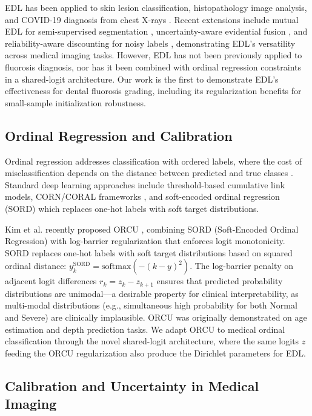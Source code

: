 EDL has been applied to skin lesion classification, histopathology image analysis, and COVID-19 diagnosis from chest X-rays \cite{ulmer2022prior}. Recent extensions include mutual EDL for semi-supervised segmentation \cite{he2024medl}, uncertainty-aware evidential fusion \cite{zheng2023uncertaintyfusion}, and reliability-aware discounting for noisy labels \cite{li2024rednet}, demonstrating EDL's versatility across medical imaging tasks. However, EDL has not been previously applied to fluorosis diagnosis, nor has it been combined with ordinal regression constraints in a shared-logit architecture. Our work is the first to demonstrate EDL's effectiveness for dental fluorosis grading, including its regularization benefits for small-sample initialization robustness.

\subsection{Ordinal Regression and Calibration}

Ordinal regression addresses classification with ordered labels, where the cost of misclassification depends on the distance between predicted and true classes \cite{cao2020corn}. Standard deep learning approaches include threshold-based cumulative link models, CORN/CORAL frameworks \cite{cao2020corn}, and soft-encoded ordinal regression (SORD) \cite{diaz2018sord} which replaces one-hot labels with soft target distributions.

Kim et al. recently proposed ORCU \cite{kim2025orcu}, combining SORD (Soft-Encoded Ordinal Regression) with log-barrier regularization that enforces logit monotonicity. SORD replaces one-hot labels with soft target distributions based on squared ordinal distance: $y^{\text{SORD}}_k = \text{softmax}(-(k - y)^2)$. The log-barrier penalty on adjacent logit differences $r_k = z_k - z_{k+1}$ ensures that predicted probability distributions are unimodal---a desirable property for clinical interpretability, as multi-modal distributions (e.g., simultaneous high probability for both Normal and Severe) are clinically implausible. ORCU was originally demonstrated on age estimation and depth prediction tasks. We adapt ORCU to medical ordinal classification through the novel shared-logit architecture, where the same logits $z$ feeding the ORCU regularization also produce the Dirichlet parameters for EDL.

\subsection{Calibration and Uncertainty in Medical Imaging}

